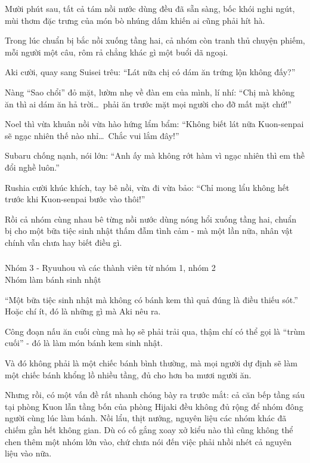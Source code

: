 \documentclass[../main.tex]{subfiles}
\begin{document}
Mười phút sau, tất cả tám nồi nước dùng đều đã sẵn sàng, bốc khói nghi ngút, mùi thơm đặc trưng của món bò nhúng dấm khiến ai cũng phải hít hà.

Trong lúc chuẩn bị bắc nồi xuống tầng hai, cả nhóm còn tranh thủ chuyện phiếm, mỗi người một câu, rôm rả chẳng khác gì một buổi dã ngoại.

Aki cười, quay sang Suisei trêu: ``Lát nữa chị có dám ăn trứng lộn không đấy?''

Nàng ``Sao chổi'' đỏ mặt, lườm nhẹ về đàn em của mình, lí nhí: ``Chị mà không ăn thì ai dám ăn hả trời\dots\ phải ăn trước mặt mọi người cho đỡ mất mặt chứ!''

Noel thì vừa khuân nồi vừa hào hứng lẩm bẩm: ``Không biết lát nữa Kuon-senpai sẽ ngạc nhiên thế nào nhỉ\dots\ Chắc vui lắm đây!''

Subaru chống nạnh, nói lớn: ``Anh ấy mà không rớt hàm vì ngạc nhiên thì em thề đổi nghề luôn.''

Rushia cười khúc khích, tay bê nồi, vừa đi vừa bảo: ``Chỉ mong lẩu không hết trước khi Kuon-senpai bước vào thôi!''

Rồi cả nhóm cùng nhau bê từng nồi nước dùng nóng hổi xuống tầng hai, chuẩn bị cho một bữa tiệc sinh nhật thấm đẫm tình cảm - mà một lần nữa, nhân vật chính vẫn chưa hay biết điều gì.

\subsubsection*{\label{P4.1c}}

\begin{center}
    {\color{T2} Nhóm 3 - Ryuuhou và các thành viên từ nhóm 1, nhóm 2\\Nhóm làm bánh sinh nhật}
\end{center}

``Một bữa tiệc sinh nhật mà không có bánh kem thì quả đúng là điều thiếu sót.'' Hoặc chí ít, đó là những gì mà Aki nêu ra.

Công đoạn nấu ăn cuối cùng mà họ sẽ phải trải qua, thậm chí có thể gọi là ``trùm cuối'' - đó là làm món bánh kem sinh nhật.

Và đó không phải là một chiếc bánh bình thường, mà mọi người dự định sẽ làm một chiếc bánh khổng lồ nhiều tầng, đủ cho hơn ba mươi người ăn.

Nhưng rồi, có một vấn đề rất nhanh chóng bày ra trước mắt: cả căn bếp tầng sáu tại phòng Kuon lẫn tầng bốn của phòng Hijaki đều không đủ rộng để nhóm đông người cùng lúc làm bánh. Nồi lẩu, thịt nướng, nguyên liệu các nhóm khác đã chiếm gần hết không gian. Dù có cố gắng xoay xở kiểu nào thì cũng không thể chen thêm một nhóm lớn vào, chứ chưa nói đến việc phải nhồi nhét cả nguyên liệu vào nữa.
\end{document}
